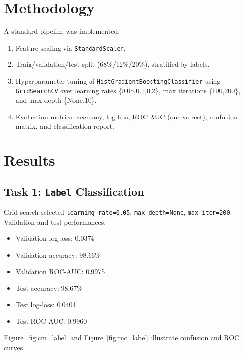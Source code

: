 \documentclass[12pt]{article}
\begin{document}
\section{Methodology}
A standard pipeline was implemented:
\begin{enumerate}
  \item Feature scaling via \texttt{StandardScaler}.
  \item Train/validation/test split (68\%/12\%/20\%), stratified by labels.
  \item Hyperparameter tuning of \texttt{HistGradientBoostingClassifier} using \texttt{GridSearchCV} over learning rates \{0.05,0.1,0.2\}, max iterations \{100,200\}, and max depth \{None,10\}.
  \item Evaluation metrics: accuracy, log-loss, ROC-AUC (one-vs-rest), confusion matrix, and classification report.
\end{enumerate}

\section{Results}

\subsection{Task 1: \texttt{Label} Classification}
Grid search selected \texttt{learning\_rate=0.05}, \texttt{max\_depth=None}, \texttt{max\_iter=200}. Validation and test performances:
\begin{itemize}
  \item Validation log-loss: 0.0374
  \item Validation accuracy: 98.66\%
  \item Validation ROC-AUC: 0.9975
  \item Test accuracy: 98.67\%
  \item Test log-loss: 0.0401
  \item Test ROC-AUC: 0.9960
\end{itemize}

Figure~\ref{fig:cm_label} and Figure~\ref{fig:roc_label} illustrate confusion and ROC curves.
\end{document}
